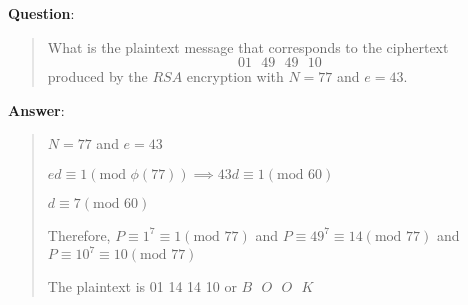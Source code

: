 \documentclass{article} %
\begin{document}
\bigskip
\noindent
\textbf{Question}:
\begin{quote}
    What is the plaintext message that corresponds to the ciphertext
    \[01 \text{ } 49 \text{ } 49 \text{ } 10\]
    produced by the $RSA$ encryption with $N = 77$ and $e = 43$.
\end{quote}

\bigskip
\noindent
\textbf{Answer}:
\begin{quote}
    $N = 77$ and $e = 43$

    $ed \equiv 1 (\text{mod }\phi(77)) \implies 43d \equiv 1 (\text{mod }60)$

    $d \equiv 7 (\text{mod }60)$

    Therefore, $P \equiv 1^7 \equiv 1(\text{mod }77)$ and $P \equiv 49^7 \equiv 14(\text{mod }77)$ and $P \equiv 10^7 \equiv 10 (\text{mod }77)$

    The plaintext is 01 14 14 10 or $\boxed{B \text{ } O \text{ } O \text{ } K}$
\end{quote}
\end{document}
